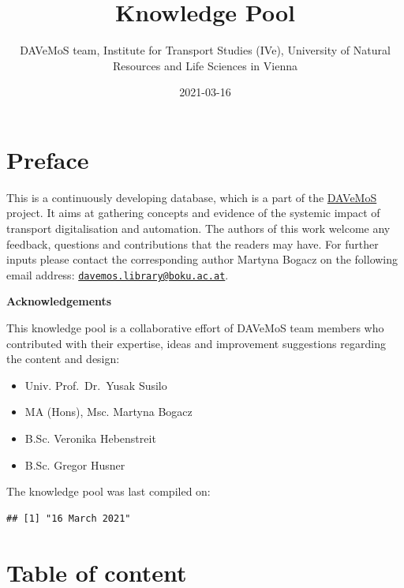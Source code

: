 \documentclass[
]{book}
\title{Knowledge Pool}
\author{DAVeMoS team, Institute for Transport Studies (IVe), University of Natural Resources and Life Sciences in Vienna}
\date{2021-03-16}
\providecommand{\tightlist}{%
  \setlength{\itemsep}{0pt}\setlength{\parskip}{0pt}}
\begin{document}
\maketitle

{
\setcounter{tocdepth}{1}
\tableofcontents
}
\hypertarget{preface}{%
\chapter*{Preface}\label{preface}}

This is a continuously developing database, which is a part of the \href{https://www.davemos.online/}{DAVeMoS} project. It aims at gathering concepts and evidence of the systemic impact of transport digitalisation and automation. The authors of this work welcome any feedback, questions and contributions that the readers may have. For further inputs please contact the corresponding author Martyna Bogacz on the following email address: \href{mailto:davemos.library@boku.ac.at}{\nolinkurl{davemos.library@boku.ac.at}}.

\textbf{Acknowledgements}

This knowledge pool is a collaborative effort of DAVeMoS team members who contributed with their expertise, ideas and improvement suggestions regarding the content and design:

\begin{itemize}
\tightlist
\item
  Univ. Prof.~Dr.~Yusak Susilo
\item
  MA (Hons), Msc. Martyna Bogacz
\item
  B.Sc. Veronika Hebenstreit
\item
  B.Sc. Gregor Husner
\end{itemize}

The knowledge pool was last compiled on:

\begin{verbatim}
## [1] "16 March 2021"
\end{verbatim}

\hypertarget{table-of-content}{%
\chapter*{Table of content}\label{table-of-content}}
\end{document}
